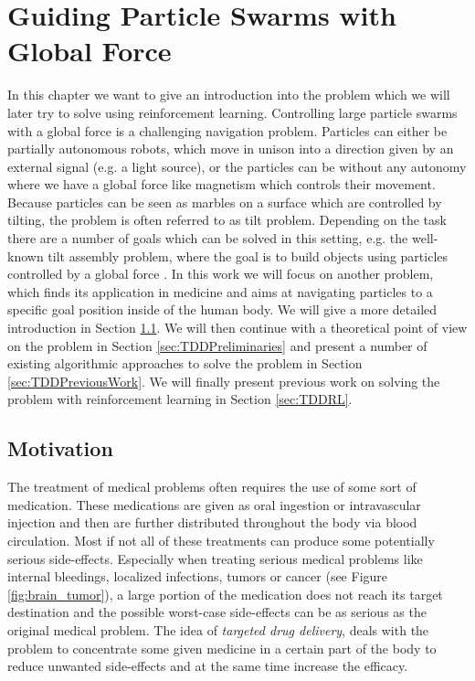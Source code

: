 \chapter{Guiding Particle Swarms with Global Force}
In this chapter we want to give an introduction into the problem which we will later try to solve using reinforcement learning. Controlling large particle swarms with a global force is a challenging navigation problem. Particles can either be partially autonomous robots, which move in unison into a direction given by an external signal (e.g. a light source), or the particles can be without any autonomy where we have a global force like magnetism which controls their movement. Because particles can be seen as marbles on a surface which are controlled by tilting, the problem is often referred to as tilt problem. Depending on the task there are a number of goals which can be solved in this setting, e.g. the well-known tilt assembly problem, where the goal is to build objects using particles controlled by a global force \cite{becker2018tilt}. In this work we will focus on another problem, which finds its application in medicine and aims at navigating particles to a specific goal position inside of the human body. We will give a more detailed introduction in Section \ref{sec:TDDMotivation}. We will then continue with a theoretical point of view on the problem in Section \ref{sec:TDDPreliminaries} and present a number of existing algorithmic approaches to solve the problem in Section \ref{sec:TDDPreviousWork}. We will finally present previous work on solving the problem with reinforcement learning in Section \ref{sec:TDDRL}. 

\section{Motivation} \label{sec:TDDMotivation}
The treatment of medical problems often requires the use of some sort of medication. These medications are given as oral ingestion or intravascular  injection and then are further distributed throughout the body via blood circulation. Most if not all of these treatments can produce some potentially serious side-effects. Especially when treating serious medical problems like internal bleedings, localized infections, tumors or cancer (see Figure \ref{fig:brain_tumor}), a large portion of the medication does not reach its target destination and the possible worst-case side-effects can be as serious as the original medical problem. The idea of \textit{targeted drug delivery}, deals with the problem to concentrate some given medicine in a certain part of the body to reduce unwanted side-effects and at the same time increase the efficacy.

